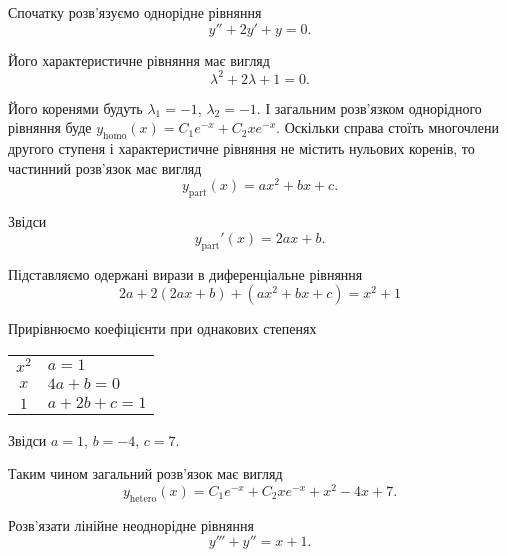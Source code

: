 \begin{solution}
	Спочатку розв'язуємо однорідне рівняння
	\begin{equation*}
		y'' + 2 y' + y = 0.	
	\end{equation*}

	Його характеристичне рівняння має вигляд
	\begin{equation*}
		\lambda^2 + 2 \lambda + 1 = 0.
	\end{equation*}

	Його коренями будуть $\lambda_1 = -1$, $\lambda_2 = -1$. І загальним роз\-в'яз\-ком однорідного рівняння буде $y_{\text{homo}}(x) = C_1 e^{-x} + C_2 x e^{-x}$. Оскільки справа стоїть многочлени другого ступеня і характеристичне рівняння не містить нульових коренів, то частинний роз\-в'яз\-ок має вигляд
	\begin{equation*}
		y_{\text{part}}(x) = a x^2 + b x + c.
	\end{equation*}

	Звідси
	\begin{equation*}
		y_{\text{part}}'(x) = 2 a x + b.	
	\end{equation*}

	Підставляємо одержані вирази в диференціальне рівняння
	\begin{equation*}
		2 a + 2 (2 a x + b) + (a x^2 + b x + c) = x^2 + 1
	\end{equation*}

	Прирівнюємо коефіцієнти при однакових степенях
	\begin{table}[H]
		\centering
		\begin{tabular}{c|l}
			$x^2$ & $a = 1$ \\
			$x$ & $4 a + b = 0$ \\
			$1$ & $a + 2 b + c = 1$
		\end{tabular}
	\end{table}

	Звідси $a = 1$, $b = - 4$, $c = 7$. \parvskip

	Таким чином загальний розв'язок має вигляд
	\begin{equation*}
		y_{\text{hetero}}(x) = C_1 e^{-x} + C_2 x e^{-x} + x^2 - 4 x + 7.
	\end{equation*}
\end{solution}

\begin{example}
	Розв'язати лінійне неоднорідне рівняння \[y''' + y'' = x + 1.\]
\end{example}

